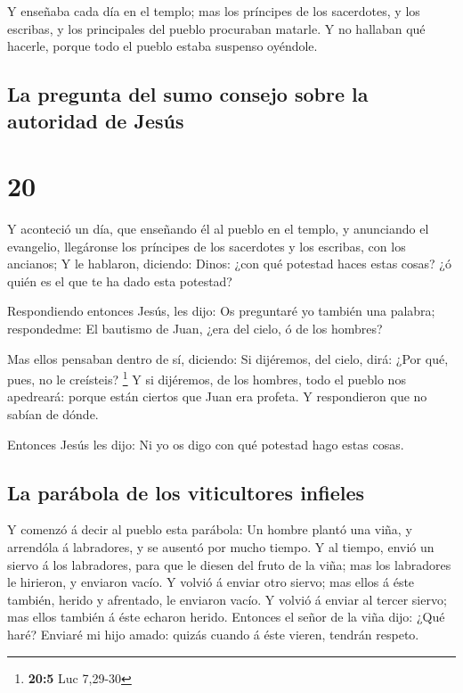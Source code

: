  Y enseñaba cada día en el templo; mas los príncipes de los
sacerdotes, y los escribas, y los principales del pueblo procuraban
matarle.  Y no hallaban qué hacerle, porque todo el pueblo
estaba suspenso oyéndole.

\hypertarget{la-pregunta-del-sumo-consejo-sobre-la-autoridad-de-jesuxfas}{%
\subsection{La pregunta del sumo consejo sobre la autoridad de
Jesús}\label{la-pregunta-del-sumo-consejo-sobre-la-autoridad-de-jesuxfas}}

\hypertarget{section-19}{%
\section{20}\label{section-19}}

 Y aconteció un día, que enseñando él al pueblo en el
templo, y anunciando el evangelio, llegáronse los príncipes de los
sacerdotes y los escribas, con los ancianos;  Y le hablaron,
diciendo: Dinos: ¿con qué potestad haces estas cosas? ¿ó quién es el que
te ha dado esta potestad?

 Respondiendo entonces Jesús, les dijo: Os preguntaré yo
también una palabra; respondedme:  El bautismo de Juan, ¿era
del cielo, ó de los hombres?

 Mas ellos pensaban dentro de sí, diciendo: Si dijéremos,
del cielo, dirá: ¿Por qué, pues, no le creísteis? \footnote{\textbf{20:5}
  Luc 7,29-30}  Y si dijéremos, de los hombres, todo el
pueblo nos apedreará: porque están ciertos que Juan era profeta.
 Y respondieron que no sabían de dónde.

 Entonces Jesús les dijo: Ni yo os digo con qué potestad
hago estas cosas.

\hypertarget{la-paruxe1bola-de-los-viticultores-infieles}{%
\subsection{La parábola de los viticultores
infieles}\label{la-paruxe1bola-de-los-viticultores-infieles}}

 Y comenzó á decir al pueblo esta parábola: Un hombre plantó
una viña, y arrendóla á labradores, y se ausentó por mucho tiempo.
 Y al tiempo, envió un siervo á los labradores, para que le
diesen del fruto de la viña; mas los labradores le hirieron, y enviaron
vacío.  Y volvió á enviar otro siervo; mas ellos á éste
también, herido y afrentado, le enviaron vacío.  Y volvió á
enviar al tercer siervo; mas ellos también á éste echaron herido.
 Entonces el señor de la viña dijo: ¿Qué haré? Enviaré mi
hijo amado: quizás cuando á éste vieren, tendrán respeto.

